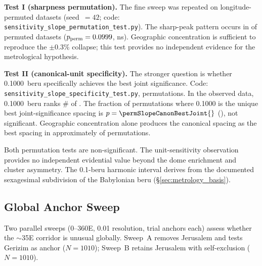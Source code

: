 \documentclass[12pt,a4paper]{article}
\begin{document}
\textbf{Test I (sharpness permutation).}
The fine sweep was repeated on \permSlopeNperms{} longitude-permuted datasets
(seed~$= 42$; code: \texttt{sensitivity\_slope\_permutation\_test.py}).
The sharp-peak pattern occurs in \permSlopePsharp{} of permuted datasets
($p_\mathrm{perm} = 0.0999$, ns). Geographic concentration is
sufficient to reproduce the $\pm 0.3\%$ collapse; this test provides no
independent evidence for the metrological hypothesis.

\textbf{Test II (canonical-unit specificity).}
\label{sec:sensitivity_slope_specificity}
The stronger question is whether 0.1000~beru specifically achieves the best
joint significance. Code: \texttt{sensitivity\_slope\_specificity\allowbreak\_test.py},
\permSlopeSpecN{} permutations. In the observed data, 0.1000~beru ranks
\#\permSlopeCanonRankObs{} of \NfineSweepSpacings{}. The fraction of
permutations where 0.1000 is the unique best joint-significance spacing is
$p = \permSlopeCanonBestJoint{}$ (\permSlopeCanonBestJointSig{}), not
significant. Geographic concentration alone produces the canonical spacing as
the best spacing in approximately \permSlopeCanonBestJoint{} of permutations.

Both permutation tests are non-significant. The unit-sensitivity observation
provides no independent evidential value beyond the dome enrichment and
cluster asymmetry. The 0.1-beru harmonic interval derives from the documented
sexagesimal subdivision of the Babylonian beru (\S\ref{sec:metrology_basis}).

\subsection{Global Anchor Sweep}
\label{sec:sensitivity_global}

Two parallel sweeps (0--360\textdegree{}E, 0.01\textdegree{} resolution,
\anchorSweepNanchors{} trial anchors each) assess whether the
$\sim$35\textdegree{}E corridor is unusual globally.
Sweep~A removes Jerusalem and tests Gerizim as anchor ($N = 1010$);
Sweep~B retains Jerusalem with self-exclusion ($N = 1010$).
\end{document}
